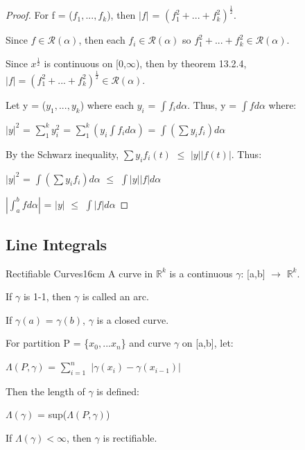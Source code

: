     \begin{proof}
        For f = ($f_1,...,f_k$), then $|f|$ = $(f_1^2 + ... + f_k^2)^{\frac{1}{2}}$.

        Since $f \in \mathscr{R}(\alpha)$,
        then each $f_i \in \mathscr{R}(\alpha)$ so
        $f_1^2+...+f_k^2 \in \mathscr{R}(\alpha)$.

        Since $x^{\frac{1}{2}}$ is continuous on [0,$\infty$), then by
        {\color{red} theorem 13.2.4},
        $|f| = (f_1^2 + ... + f_k^2)^{\frac{1}{2}} \in \mathscr{R}(\alpha)$.

        Let y = ($y_1,...,y_k$) where each $y_i$ = $\int f_i d\alpha$.
        Thus, y = $\int f d\alpha$ where:

        \hspace{0.5cm}
        $|y|^2$
        = $\sum_1^k y_i^2$
        = $\sum_1^k (y_i \int f_i d\alpha)$
        = $\int (\sum y_i f_i) d\alpha$

        By the Schwarz inequality, 
        $\sum y_i f_i(t)$ $\leq$ $|y| |f(t)|$.
        Thus:

        \hspace{0.5cm}
        $|y|^2$
        = $\int (\sum y_i f_i) d\alpha$
        $\leq$ $\int |y| |f| d\alpha$

        \hspace{0.5cm}
        $|\int_a^b f d\alpha|$
        = $|y|$ $\leq$ $\int |f| d\alpha$    
    \end{proof}

    \newpage





\subsection{ Line Integrals }

    \begin{definition}{Rectifiable Curves}{16cm}
        A curve in $\mathbb{R}^k$ is a continuous
        $\gamma$: [a,b] $\rightarrow$ $\mathbb{R}^k$.

        \hspace{0.5cm}
        If $\gamma$ is 1-1, then $\gamma$ is called an arc.

        \hspace{0.5cm}
        If $\gamma(a)$ = $\gamma(b)$, $\gamma$ is a closed curve.

        \vspace{0.2cm}

        For partition P = \{$x_0,...x_n$\} and curve $\gamma$ on [a,b], let:

        \hspace{0.5cm}
        $\Lambda(P,\gamma)$
        = $\sum_{i=1}^n$ $|\gamma(x_i) - \gamma(x_{i-1})|$

        Then the length of $\gamma$ is defined:

        \hspace{0.5cm}
        $\Lambda(\gamma)$ = sup($\Lambda(P,\gamma)$)

        If $\Lambda(\gamma) < \infty$, then
        $\gamma$ is {\color{lblue} rectifiable}.        
    \end{definition}

